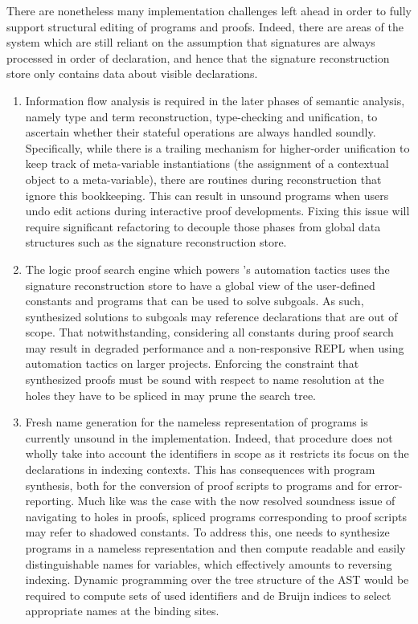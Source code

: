 There are nonetheless many implementation challenges left ahead in order to fully support structural editing of \Beluga programs and \Harpoon proofs.
Indeed, there are areas of the system which are still reliant on the assumption that signatures are always processed in order of declaration, and hence that the signature reconstruction store only contains data about visible declarations.

\begin{enumerate}
\item
Information flow analysis is required in the later phases of semantic analysis, namely type and term reconstruction, type-checking and unification, to ascertain whether their stateful operations are always handled soundly.
Specifically, while there is a trailing mechanism for higher-order unification to keep track of meta-variable instantiations (the assignment of a contextual object to a meta-variable), there are routines during \LF reconstruction that ignore this bookkeeping.
This can result in unsound programs when users undo edit actions during interactive proof developments.
Fixing this issue will require significant refactoring to decouple those phases from global data structures such as the signature reconstruction store.
\item
The logic proof search engine which powers \Harpoon's automation tactics uses the signature reconstruction store to have a global view of the user-defined constants and programs that can be used to solve subgoals.
As such, synthesized solutions to subgoals may reference declarations that are out of scope.
That notwithstanding, considering all constants during proof search may result in degraded performance and a non-responsive \ac{REPL} when using automation tactics on larger projects.
Enforcing the constraint that synthesized proofs must be sound with respect to name resolution at the holes they have to be spliced in may prune the search tree.
\item 
Fresh name generation for the nameless representation of \Beluga programs is currently unsound in the implementation.
Indeed, that procedure does not wholly take into account the identifiers in scope as it restricts its focus on the declarations in indexing contexts.
This has consequences with program synthesis, both for the conversion of \Harpoon proof scripts to \Beluga programs and for error-reporting.
Much like was the case with the now resolved soundness issue of navigating to holes in \Harpoon proofs, spliced \Beluga programs corresponding to \Harpoon proof scripts may refer to shadowed constants.
To address this, one needs to synthesize programs in a nameless representation and then compute readable and easily distinguishable names for variables, which effectively amounts to reversing indexing.
Dynamic programming over the tree structure of the \ac{AST} would be required to compute sets of used identifiers and de Bruijn indices to select appropriate names at the binding sites.
\end{enumerate}

